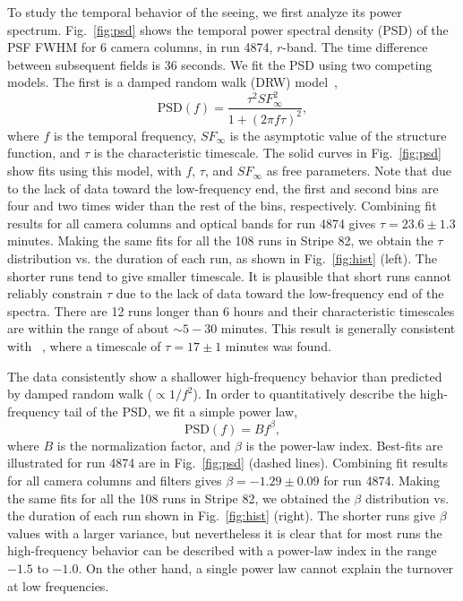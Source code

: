 To study the temporal behavior of the seeing, we first analyze its power spectrum.
Fig.~\ref{fig:psd} shows the temporal power spectral density (PSD) of the
PSF FWHM for 6 camera columns, in run 4874, $r$-band.
The time difference between subsequent fields is 36 seconds.
We fit the PSD using two competing models.
The first is a damped random walk (DRW) model~\citep[for introduction see Chapter 10 in][]{zeljkoBook},
\begin{equation}
\textrm{PSD}(f) = \frac{\tau^2 SF^2_{\infty}}{1+(2\pi f \tau)^2},
\end{equation}
where $f$ is the temporal frequency, $SF_{\infty}$ is the asymptotic
value of the structure function, and $\tau$ is the
characteristic timescale.
The solid curves in Fig.~\ref{fig:psd} show fits using this model,
with $f$, $\tau$, and $SF_{\infty}$ as free parameters.
Note that due to the lack of data toward the low-frequency end, the
first and second bins are four and two times wider than the
rest of the bins, respectively.
Combining fit results for all camera columns and optical bands for run 4874
gives $\tau = 23.6 \pm 1.3$ minutes.
Making the same fits for all the 108 runs in Stripe 82, 
we obtain the $\tau$ distribution vs. the duration of each
run, as shown in Fig.~\ref{fig:hist} (left).
The shorter runs tend to give smaller timescale. It is plausible that short runs 
cannot reliably constrain $\tau$ due to the lack of data toward the low-frequency 
end of the spectra. There are 12 runs longer than 6 hours and their characteristic timescales
are within the range of about $\sim5-30$ minutes.
This result is generally consistent with ~\cite{Racine1996}, where a timescale of 
$\tau = 17 \pm 1$ minutes was found.

The data consistently show a shallower high-frequency behavior than predicted
by damped random walk ($\propto 1/f^2$). In order to quantitatively describe 
the high-frequency tail of the PSD, we fit a simple power law,
\begin{equation}
\textrm{PSD}(f) = B f^\beta,
\end{equation}
where $B$ is the normalization factor, and $\beta$ is the power-law index.
Best-fits are illustrated for run 4874 are in Fig.~\ref{fig:psd} (dashed lines).
Combining fit results for all camera columns and filters gives $\beta = -1.29\pm 0.09$ 
for run 4874. Making the same fits for all the 108 runs in Stripe 82, we obtained the 
$\beta$ distribution vs. the duration of each run shown in Fig.~\ref{fig:hist} (right).
The shorter runs give $\beta$ values with a larger variance, but nevertheless it is 
clear that for most runs the high-frequency behavior can be described with a 
power-law index in the range $-1.5$ to $-1.0$. On the other hand, a single 
power law cannot explain the turnover at low frequencies. 

